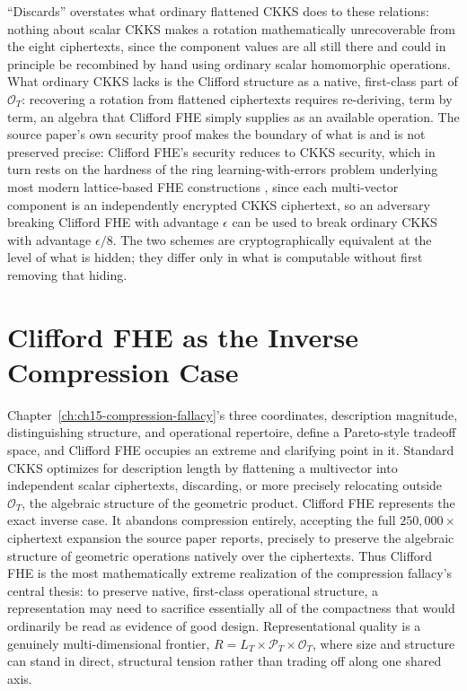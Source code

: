 ``Discards'' overstates what ordinary flattened CKKS does to these relations: nothing about scalar CKKS makes a rotation mathematically unrecoverable from the eight ciphertexts, since the component values are all still there and could in principle be recombined by hand using ordinary scalar homomorphic operations. What ordinary CKKS lacks is the Clifford structure as a native, first-class part of $\mathcal{O}_T$: recovering a rotation from flattened ciphertexts requires re-deriving, term by term, an algebra that Clifford FHE simply supplies as an available operation. The source paper's own security proof makes the boundary of what is and is not preserved precise: Clifford FHE's security reduces to CKKS security, which in turn rests on the hardness of the ring learning-with-errors problem underlying most modern lattice-based FHE constructions \cite{lyubashevsky2010,albrecht2018,gentry2009,halevi2018,vaikuntanathan2015}, since each multi-vector component is an independently encrypted CKKS ciphertext, so an adversary breaking Clifford FHE with advantage $\epsilon$ can be used to break ordinary CKKS with advantage $\epsilon/8$. The two schemes are cryptographically equivalent at the level of what is hidden; they differ only in what is computable without first removing that hiding.

\section{Clifford FHE as the Inverse Compression Case}

Chapter~\ref{ch:ch15-compression-fallacy}'s three coordinates, description magnitude, distinguishing structure, and operational repertoire, define a Pareto-style tradeoff space, and Clifford FHE occupies an extreme and clarifying point in it. Standard CKKS optimizes for description length by flattening a multivector into independent scalar ciphertexts, discarding, or more precisely relocating outside $\mathcal{O}_T$, the algebraic structure of the geometric product. Clifford FHE represents the exact inverse case. It abandons compression entirely, accepting the full $250{,}000\times$ ciphertext expansion the source paper reports, precisely to preserve the algebraic structure of geometric operations natively over the ciphertexts. Thus Clifford FHE is the most mathematically extreme realization of the compression fallacy's central thesis: to preserve native, first-class operational structure, a representation may need to sacrifice essentially all of the compactness that would ordinarily be read as evidence of good design. Representational quality is a genuinely multi-dimensional frontier, $R = L_T \times \mathcal{P}_T \times \mathcal{O}_T$, where size and structure can stand in direct, structural tension rather than trading off along one shared axis.

